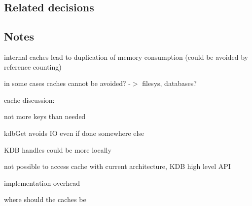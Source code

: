 \subsection*{Related decisions}

\subsection*{Notes}

internal caches lead to duplication of memory consumption (could be avoided by reference counting)

in some cases caches cannot be avoided? -\/$>$ filesys, databases?

cache discussion\+:
\begin{DoxyItemize}
\item not more keys than needed
\item kdb\+Get avoids I\+O even if done somewhere else
\item K\+D\+B handles could be more locally
\item not possible to access cache with current architecture, K\+D\+B high level A\+P\+I
\item implementation overhead
\item where should the caches be 
\end{DoxyItemize}